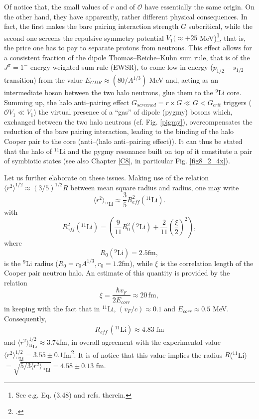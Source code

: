 Of notice that, the small values of $r$ and of $\mathcal{O}$ have essentially the same origin. On the other hand, they have apparently, rather different physical consequences. In fact, the first makes the bare pairing interaction strength $G$ subcritical, while the second one screens the repulsive symmetry potential $V_1(\approx +25 $ MeV)\footnote{See e.g. \cite{Bortignon:98} Eq. (3.48) and refs. therein.}, that is, the price one has to pay to separate protons from neutrons. This effect allows for a consistent fraction of the dipole Thomas--Reiche--Kuhn sum rule, that is of the $J^{\pi}=1^-$ energy weighted sum rule (EWSR), to come low in energy ($p_{1/2}-s_{1/2}$ transition) from the value $E_{GDR}\approx(80/A^{1/3})$ MeV and, acting as an intermediate boson between the two halo neutrons, glue them to the $^{9}$Li core. Summing up, the halo anti--pairing effect $G_{screened}=r\times G\ll G<G_{crit}$ triggers ($\mathcal{O}V_1\ll V_1$) the virtual presence of a ``gas'' of dipole (pygmy) bosons which, exchanged between the two halo neutrons (cf. Fig. \ref{pigmy}), overcompensates the reduction of the bare pairing interaction, leading to the binding of the halo Cooper pair to the core (anti--(halo anti--pairing effect)). It can thus be stated that the halo of $^{11}$Li and the pygmy resonance built on top of it constitute a pair of symbiotic states (see also Chapter \ref{C8}, in particular Fig. \ref{fig8_2_4x}).

Let us further elaborate on these issues. Making use of the relation $\langle r^2\rangle^{1/2}\approx (3/5)^{1/2}R$ between mean square radius and radius, one may write
\begin{equation*}
\langle r^2\rangle_{^{11}\text{Li}}\approx \frac{3}{5}R_{eff}^2(^{11}\text{Li}).
\end{equation*}
 with
\begin{equation*}
R_{eff}^2(^{11}\text{Li})=\left(\frac{9}{11}R_0^2(^9\text{Li})+\frac{2}{11}\left(\frac{\xi}{2}\right)^2\right),
\end{equation*}
where
\begin{equation*}
R_0(^9\text{Li})=2.5 \text{fm},
\end{equation*}
is the $^9$Li radius ($R_0=r_0A^{1/3}, r_0=1.2$fm), while $\xi$ is the correlation length of the Cooper pair neutron halo. An estimate of this quantity is provided by the relation
 \begin{equation*}
\xi=\frac{\hbar v_F}{2E_{corr}}\approx 20 \, \text{fm},
 \end{equation*}
in keeping with the fact that in $^{11}$Li, $(v_F/c)\approx 0.1$ and $E_{corr}\approx0.5$ MeV. Consequently, 
\begin{align}\label{eq2.F.5}
R_{eff}\,(^{11}\text{Li})\approx 4.83 \;\text{fm}
\end{align} 
and  $\langle r^2\rangle_{^{11}\text{Li}}^{1/2}\approx 3.74$fm, in overall agreement with the experimental value $\langle r^2\rangle_{^{11}\text{Li}}^{1/2}= 3.55\pm0.1$fm\footnote{\cite{Kobayashi:89}.}. It is of notice that this value implies  the radius $R$($^{11}$Li)$=\sqrt{5/3\langle r^2\rangle_{^{11}\text{Li}}}=4.58\pm 0.13$ fm.


